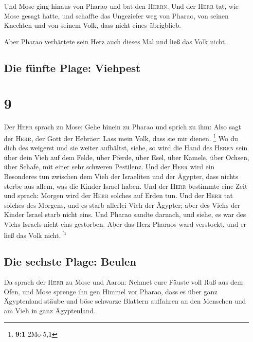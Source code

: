  Und Mose ging hinaus von Pharao und bat den
\textsc{Herrn}.  Und der \textsc{Herr} tat, wie Mose
gesagt hatte, und schaffte das Ungeziefer weg von Pharao, von seinen
Knechten und von seinem Volk, dass nicht eines übrigblieb.

 Aber Pharao verhärtete sein Herz auch dieses Mal und
ließ das Volk nicht.

\hypertarget{die-fuxfcnfte-plage-viehpest}{%
\subsection{Die fünfte Plage:
Viehpest}\label{die-fuxfcnfte-plage-viehpest}}

\hypertarget{section-8}{%
\section{9}\label{section-8}}

 Der \textsc{Herr} sprach zu Mose: Gehe hinein zu Pharao
und sprich zu ihm: Also sagt der \textsc{Herr}, der Gott der Hebräer:
Lass mein Volk, dass sie mir dienen. \footnote{\textbf{9:1} 2Mo 5,1}
 Wo du dich des weigerst und sie weiter aufhältst,
 siehe, so wird die Hand des \textsc{Herrn} sein über dein
Vieh auf dem Felde, über Pferde, über Esel, über Kamele, über Ochsen,
über Schafe, mit einer sehr schweren Pestilenz.  Und der
\textsc{Herr} wird ein Besonderes tun zwischen dem Vieh der Israeliten
und der Ägypter, dass nichts sterbe aus allem, was die Kinder Israel
haben.  Und der \textsc{Herr} bestimmte eine Zeit und
sprach: Morgen wird der \textsc{Herr} solches auf Erden tun.
 Und der \textsc{Herr} tat solches des Morgens, und es
starb allerlei Vieh der Ägypter; aber des Viehs der Kinder Israel starb
nicht eins.  Und Pharao sandte darnach, und siehe, es war
des Viehs Israels nicht eins gestorben. Aber das Herz Pharaos ward
verstockt, und er ließ das Volk nicht. \textsuperscript{b}

\hypertarget{die-sechste-plage-beulen}{%
\subsection{Die sechste Plage: Beulen}\label{die-sechste-plage-beulen}}

 Da sprach der \textsc{Herr} zu Mose und Aaron: Nehmet
eure Fäuste voll Ruß aus dem Ofen, und Mose sprenge ihn gen Himmel vor
Pharao,  dass es über ganz Ägyptenland stäube und böse
schwarze Blattern auffahren an den Menschen und am Vieh in ganz
Ägyptenland.

